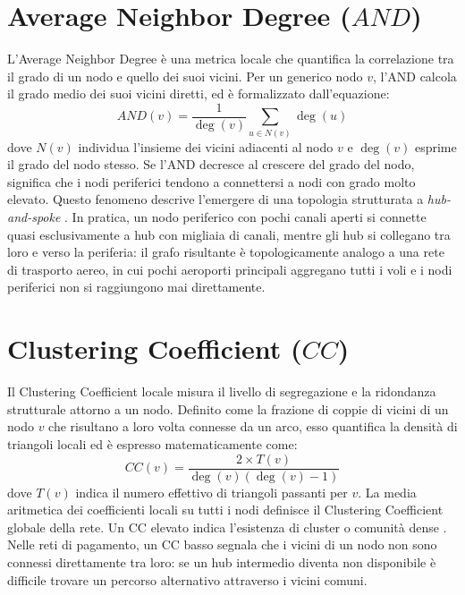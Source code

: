 \documentclass[12pt,a4paper,oneside]{book}
\begin{document}
\section{Average Neighbor Degree ($AND$)}
L'Average Neighbor Degree è una metrica locale che quantifica la correlazione tra il grado di un nodo e quello dei suoi vicini. Per un generico nodo $v$, l'AND calcola il grado medio dei suoi vicini diretti, ed è formalizzato dall'equazione:
\begin{equation}
    AND(v) = \frac{1}{\deg(v)} \sum_{u \in N(v)} \deg(u)
\end{equation}
dove $N(v)$ individua l'insieme dei vicini adiacenti al nodo $v$ e $\deg(v)$ esprime il grado del nodo stesso. Se l'AND decresce al crescere del grado del nodo, significa che i nodi periferici tendono a connettersi a nodi con grado molto elevato. Questo fenomeno descrive l'emergere di una topologia strutturata a \textit{hub-and-spoke} \cite{BarabasiAlbert1999}. In pratica, un nodo periferico con pochi canali aperti si connette quasi esclusivamente a hub con migliaia di canali, mentre gli hub si collegano tra loro e verso la periferia: il grafo risultante è topologicamente analogo a una rete di trasporto aereo, in cui pochi aeroporti principali aggregano tutti i voli e i nodi periferici non si raggiungono mai direttamente.

\section{Clustering Coefficient ($CC$)}
Il Clustering Coefficient locale misura il livello di segregazione e la ridondanza strutturale attorno a un nodo. Definito come la frazione di coppie di vicini di un nodo $v$ che risultano a loro volta connesse da un arco, esso quantifica la densità di triangoli locali ed è espresso matematicamente come:
\begin{equation}
    CC(v) = \frac{2 \times T(v)}{\deg(v)(\deg(v) - 1)}
\end{equation}
dove $T(v)$ indica il numero effettivo di triangoli passanti per $v$. La media aritmetica dei coefficienti locali su tutti i nodi definisce il Clustering Coefficient globale della rete. Un CC elevato indica l'esistenza di cluster o comunità dense \cite{MagnaniMarzolla2026}. Nelle reti di pagamento, un CC basso segnala che i vicini di un nodo non sono connessi direttamente tra loro: se un hub intermedio diventa non disponibile è difficile trovare un percorso alternativo attraverso i vicini comuni.
\end{document}
